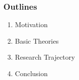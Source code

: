 \documentclass{beamer}
\begin{document}
\begin{frame}
\frametitle{Outlines}
\begin{enumerate}
\item Motivation
\item \alert<+> {Basic Theories}
\item Research Trajectory
\item Conclusion 
\end{enumerate}
\end{frame}
\end{document}
